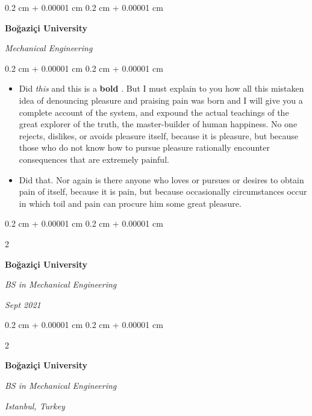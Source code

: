 \documentclass[10pt, letterpaper]{article}
\newenvironment{highlights}{
    \begin{itemize}[
        topsep=0.10 cm,
        parsep=0.10 cm,
        partopsep=0pt,
        itemsep=0pt,
        leftmargin=0.4 cm + 10pt
    ]
}{
    \end{itemize}
} %
\newenvironment{onecolentry}{
    \begin{adjustwidth}{
        0.2 cm + 0.00001 cm
    }{
        0.2 cm + 0.00001 cm
    }
}{
    \end{adjustwidth}
} %
\newenvironment{twocolentry}[2][]{
    \onecolentry
    \def\secondColumn{#2}
    \setcolumnwidth{\fill, 4.5 cm}
    \begin{paracol}{2}
}{
    \switchcolumn \raggedleft \secondColumn
    \end{paracol}
    \endonecolentry
} %
\let\hrefWithoutArrow\href
\renewcommand{\href}[2]{\hrefWithoutArrow{#1}{\ifthenelse{\equal{#2}{}}{ }{#2 }\raisebox{.15ex}{\footnotesize \faExternalLink*}}}
\begin{document}
        \vspace{0.2 cm}

        \begin{onecolentry}
            \textbf{Boğaziçi University}

            \textit{Mechanical Engineering}
        \end{onecolentry}

        \vspace{0.10 cm}
        \begin{onecolentry}
            \begin{highlights}
                \item Did \textit{this} and this is a \textbf{bold} \href{https://example.com}{link}. But I must explain to you how all this mistaken idea of denouncing pleasure and praising pain was born and I will give you a complete account of the system, and expound the actual teachings of the great explorer of the truth, the master-builder of human happiness. No one rejects, dislikes, or avoids pleasure itself, because it is pleasure, but because those who do not know how to pursue pleasure rationally encounter consequences that are extremely painful.
                \item Did that. Nor again is there anyone who loves or pursues or desires to obtain pain of itself, because it is pain, but because occasionally circumstances occur in which toil and pain can procure him some great pleasure.
            \end{highlights}
        \end{onecolentry}


        \vspace{0.2 cm}

        \begin{twocolentry}{
            
            
        \textit{Sept 2021}}
            \textbf{Boğaziçi University}

            \textit{BS in Mechanical Engineering}
        \end{twocolentry}



        \vspace{0.2 cm}

        \begin{twocolentry}{
        \textit{Istanbul, Turkey}    
            
        }
            \textbf{Boğaziçi University}

            \textit{BS in Mechanical Engineering}
        \end{twocolentry}
\end{document}
